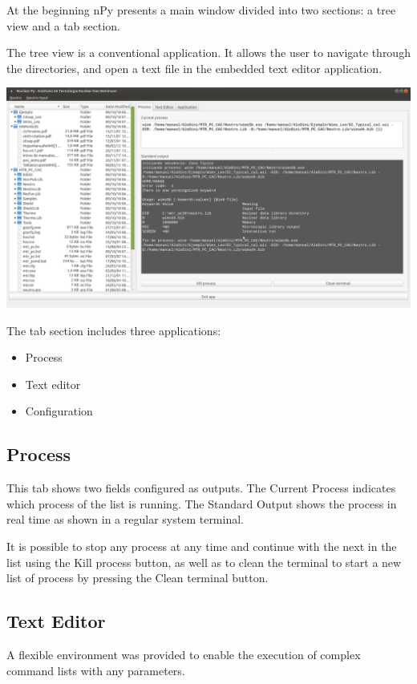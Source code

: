 \documentclass[a4paper,10pt]{article}
\begin{document}
At the beginning nPy presents a main window divided into two sections: a tree view and a tab section.

The tree view is a conventional application. It allows the user to
navigate through the directories, and open a text file in the embedded
text editor application.

\begin{center}
 \includegraphics[width=\textwidth]{img/mainWindow.png}
\end{center}

\noindent The tab section includes three applications:

\begin{itemize}
 \item Process
 \item Text editor
 \item Configuration
\end{itemize}

\subsection{Process}
This tab shows two fields configured as outputs. The Current Process indicates which process of the list is running. The Standard Output shows the process in real time as shown in a regular system terminal.

It is possible to stop any process at any time and continue with the next in the list using the Kill process button, as well as to clean the terminal to start a new list of process by pressing the Clean terminal button.

\subsection{Text Editor}

A flexible environment was provided to enable the execution of complex command lists with any parameters. 
\end{document}
